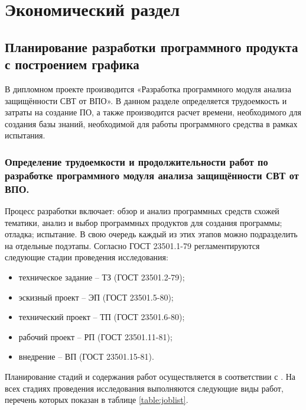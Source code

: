\section {Экономический раздел}
\subsection {Планирование разработки программного продукта с построением графика}
В дипломном проекте производится «Разработка программного модуля анализа защищённости СВТ от ВПО». В данном разделе определяется трудоемкость и затраты на создание ПО, а также производится расчет времени, необходимого для создания базы знаний, необходимой для работы программного средства в рамках испытания. 
\subsubsection {Определение трудоемкости и продолжительности работ по разработке программного модуля анализа защищённости СВТ от ВПО.}
Процесс разработки включает: обзор и анализ программных средств схожей тематики, анализ и выбор программных продуктов для создания программы; отладка; испытание. В свою очередь каждый из этих этапов можно подразделить на отдельные подэтапы.
Согласно ГОСТ 23501.1-79 регламентируются следующие стадии проведения исследования:
\begin {itemize}
	\item техническое задание – ТЗ (ГОСТ 23501.2-79);
	\item эскизный проект – ЭП (ГОСТ 23501.5-80);
	\item технический проект – ТП (ГОСТ 23501.6-80);
	\item рабочий проект – РП (ГОСТ 23501.11-81);
	\item внедрение – ВП (ГОСТ 23501.15-81).
\end {itemize}

Планирование стадий и содержания работ осуществляется в соответствии с \cite {ECONOMICS}. На всех стадиях проведения исследования выполняются следующие виды работ, перечень которых показан в таблице \ref {table:joblist}.

